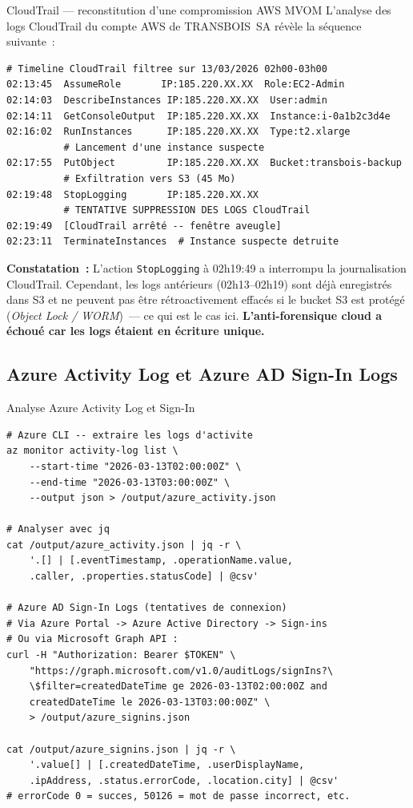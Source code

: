 \begin{boxscenario}{CloudTrail --- reconstitution d'une compromission AWS MVOM}
L'analyse des logs CloudTrail du compte AWS de TRANSBOIS~SA révèle
la séquence suivante~:

\begin{lstlisting}[language=bash_forensique]
# Timeline CloudTrail filtree sur 13/03/2026 02h00-03h00
02:13:45  AssumeRole       IP:185.220.XX.XX  Role:EC2-Admin
02:14:03  DescribeInstances IP:185.220.XX.XX  User:admin
02:14:11  GetConsoleOutput  IP:185.220.XX.XX  Instance:i-0a1b2c3d4e
02:16:02  RunInstances      IP:185.220.XX.XX  Type:t2.xlarge
          # Lancement d'une instance suspecte
02:17:55  PutObject         IP:185.220.XX.XX  Bucket:transbois-backup
          # Exfiltration vers S3 (45 Mo)
02:19:48  StopLogging       IP:185.220.XX.XX
          # TENTATIVE SUPPRESSION DES LOGS CloudTrail
02:19:49  [CloudTrail arrêté -- fenêtre aveugle]
02:23:11  TerminateInstances  # Instance suspecte detruite
\end{lstlisting}

\textbf{Constatation~:} L'action \texttt{StopLogging} à 02h19:49 a
interrompu la journalisation CloudTrail. Cependant, les logs antérieurs
(02h13--02h19) sont déjà enregistrés dans S3 et ne peuvent pas être
rétroactivement effacés si le bucket S3 est protégé
(\textit{Object Lock / WORM})~--- ce qui est le cas ici.
\textbf{L'anti-forensique cloud a échoué car les logs étaient
en écriture unique.}
\end{boxscenario}

\subsection{Azure Activity Log et Azure AD Sign-In Logs}

\begin{boxoutils}{Analyse Azure Activity Log et Sign-In}
\begin{lstlisting}[language=bash_forensique]
# Azure CLI -- extraire les logs d'activite
az monitor activity-log list \
    --start-time "2026-03-13T02:00:00Z" \
    --end-time "2026-03-13T03:00:00Z" \
    --output json > /output/azure_activity.json

# Analyser avec jq
cat /output/azure_activity.json | jq -r \
    '.[] | [.eventTimestamp, .operationName.value,
    .caller, .properties.statusCode] | @csv'

# Azure AD Sign-In Logs (tentatives de connexion)
# Via Azure Portal -> Azure Active Directory -> Sign-ins
# Ou via Microsoft Graph API :
curl -H "Authorization: Bearer $TOKEN" \
    "https://graph.microsoft.com/v1.0/auditLogs/signIns?\
    \$filter=createdDateTime ge 2026-03-13T02:00:00Z and
    createdDateTime le 2026-03-13T03:00:00Z" \
    > /output/azure_signins.json

cat /output/azure_signins.json | jq -r \
    '.value[] | [.createdDateTime, .userDisplayName,
    .ipAddress, .status.errorCode, .location.city] | @csv'
# errorCode 0 = succes, 50126 = mot de passe incorrect, etc.
\end{lstlisting}
\end{boxoutils}

